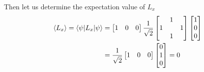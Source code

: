 \documentclass[../../../main.tex]{subfiles}
\begin{document}
Then let us determine the expectation value of $L_x$
\begin{align*}
    \braket{L_x}=\braket{\psi|L_x|\psi}&= 
    \begin{bmatrix}
        1&0&0
    \end{bmatrix}
    \frac{1 }{\sqrt{2 }}\begin{bmatrix}
        &1&\\
        1&&1\\
        &1&\\
    \end{bmatrix}
    \begin{bmatrix}
        1\\
        0\\
        0\\
    \end{bmatrix}\\
    &= 
    \frac{1 }{\sqrt{2}}
    \begin{bmatrix}
        1&0&0
    \end{bmatrix}
    \begin{bmatrix}
        0\\
        1\\
        0\\
    \end{bmatrix}
    =
    0
\end{align*}
\end{document}
